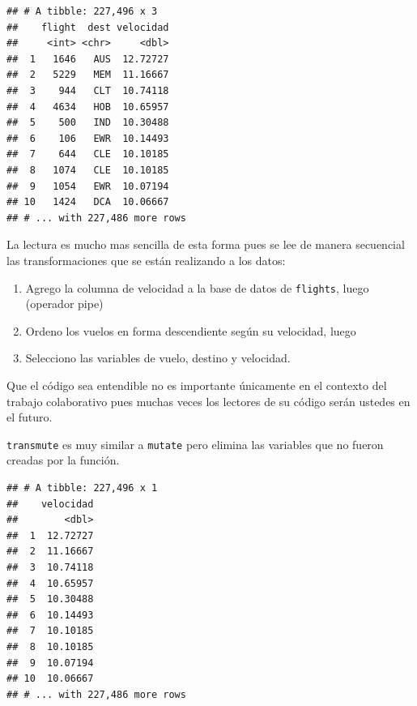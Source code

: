 \documentclass[]{article}
\newenvironment{Shaded}{\begin{snugshade}}{\end{snugshade}}
\newcommand{\KeywordTok}[1]{\textcolor[rgb]{0.13,0.29,0.53}{\textbf{#1}}}
\newcommand{\DataTypeTok}[1]{\textcolor[rgb]{0.13,0.29,0.53}{#1}}
\newcommand{\StringTok}[1]{\textcolor[rgb]{0.31,0.60,0.02}{#1}}
\newcommand{\OperatorTok}[1]{\textcolor[rgb]{0.81,0.36,0.00}{\textbf{#1}}}
\newcommand{\NormalTok}[1]{#1}
\providecommand{\tightlist}{%
  \setlength{\itemsep}{0pt}\setlength{\parskip}{0pt}}
\begin{document}
\begin{verbatim}
## # A tibble: 227,496 x 3
##    flight  dest velocidad
##     <int> <chr>     <dbl>
##  1   1646   AUS  12.72727
##  2   5229   MEM  11.16667
##  3    944   CLT  10.74118
##  4   4634   HOB  10.65957
##  5    500   IND  10.30488
##  6    106   EWR  10.14493
##  7    644   CLE  10.10185
##  8   1074   CLE  10.10185
##  9   1054   EWR  10.07194
## 10   1424   DCA  10.06667
## # ... with 227,486 more rows
\end{verbatim}

La lectura es mucho mas sencilla de esta forma pues se lee de manera
secuencial las transformaciones que se están realizando a los datos:

\begin{enumerate}
\def\labelenumi{\arabic{enumi}.}
\tightlist
\item
  Agrego la columna de velocidad a la base de datos de \texttt{flights},
  luego (operador pipe)
\item
  Ordeno los vuelos en forma descendiente según su velocidad, luego
\item
  Selecciono las variables de vuelo, destino y velocidad.
\end{enumerate}

Que el código sea entendible no es importante únicamente en el contexto
del trabajo colaborativo pues muchas veces los lectores de su código
serán ustedes en el futuro.

\texttt{transmute} es muy similar a \texttt{mutate} pero elimina las
variables que no fueron creadas por la función.

\begin{Shaded}
\end{Shaded}

\begin{verbatim}
## # A tibble: 227,496 x 1
##    velocidad
##        <dbl>
##  1  12.72727
##  2  11.16667
##  3  10.74118
##  4  10.65957
##  5  10.30488
##  6  10.14493
##  7  10.10185
##  8  10.10185
##  9  10.07194
## 10  10.06667
## # ... with 227,486 more rows
\end{verbatim}
\end{document}
